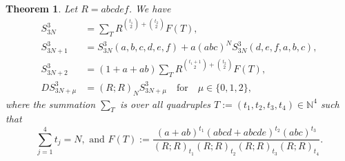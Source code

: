 \documentclass[12pt]{amsart}
\numberwithin{equation}{section}
\theoremstyle{plain}
\newtheorem{theorem}{Theorem}[section]
\theoremstyle{definition}
\newcommand{\N}{\mathbb{N}}
\begin{document}
\begin{theorem} \label{gfS_3N012} Let $R=abcdef$.
We have 
\begin{align}
\label{gfDS3b3N}
S_{3N}^3 &=
\sum_{T}R^{\binom{t_1}{2}+\binom{t_2}{2}}F(T)
,\\
\label{gfDS3b3N+1}
S_{3N+1}^3 &=S_{3N}^3(a,b,c,d,e,f)+a(abc)^N
S_{3N}^3(d,e,f,a,b,c),\\
\label{gfDS3b3N+2}
S_{3N+2}^3 &=(1+a+ab)
\sum_{T}R^{\binom{t_1+1}{2}+\binom{t_2}{2}}F(T),\\
\label{gfDS}
DS_{3N+\mu}^3 &=(R;R)_N S_{3N+\mu}^3\quad\text{for}\quad  \mu\in \{0,1,2\},
\end{align}
where the summation $\sum_T$ is over all quadruples $T:=(t_1,t_2,t_3,t_4)\in \N^4$ such that
$$
\sum_{j=1}^4t_j=N, \text{ and }
F(T):=\dfrac{(a+ab)^{t_1}(abcd+abcde)^{t_2}(abc)^{t_3}}{(R;R)_{t_1}(R;R)_{t_2}(R;R)_{t_3}(R;R)_{t_4}}.
$$
\end{theorem}
\end{document}
